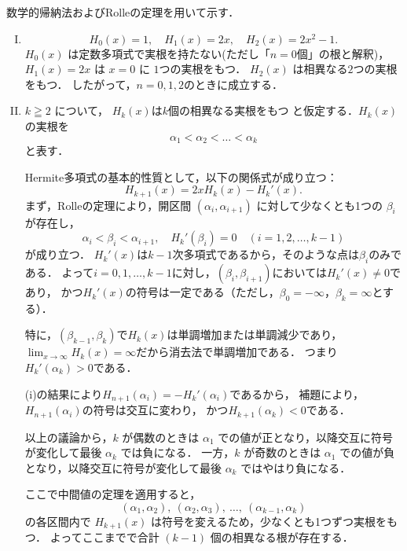 \begin{tproof}
  数学的帰納法およびRolleの定理を用いて示す．
  \noindent
  \begin{enumerate}[(I)]
    \item \mbox{}
          \[
            H_0(x) = 1, \quad H_1(x) = 2x, \quad H_2(x) = 2x^2-1.
          \]
          $H_0(x)$ は定数多項式で実根を持たない(ただし「$n=0$個」の根と解釈)，
          $H_1(x) = 2x$ は $x=0$ に $1$つの実根をもつ．
          $H_2(x)$ は相異なる$2$つの実根をもつ．
          したがって，$n=0,1,2$のときに成立する．
    \item
          $k \geqq 2$ について，
          $H_k(x)$は$k$個の相異なる実根をもつ
          と仮定する．$H_k(x)$ の実根を
          \[
            \alpha_1 < \alpha_2 < \dots < \alpha_k
          \]
          と表す．

          Hermite多項式の基本的性質として，以下の関係式が成り立つ：
          \[
            H_{k+1}(x)  = 2xH_k(x)-H_k'(x).
          \]
          まず，Rolleの定理により，開区間 $(\alpha_i,\alpha_{i+1})$ に対して少なくとも1つの $\beta_i$ が存在し，
          \[
            \alpha_i < \beta_i < \alpha_{i+1},\quad
            H_k'(\beta_i) = 0
            \quad (i=1,2,\dots,k-1)
          \]
          が成り立つ．
          $H_k '(x)$は$k-1$次多項式であるから，そのような点は$\beta_i$のみである．
          よって$i = 0,1,\dots,k-1$に対し，$(\beta_i,\beta_{i+1})$においては$H_k '(x) \ne 0$であり，
          かつ$H_k '(x)$の符号は一定である（ただし，$ \beta_0 =-\infty$，$\beta_k = \infty$とする）．

          特に，$(\beta_{k-1},\beta_k)$で$H_k (x)$は単調増加または単調減少であり，
          $\lim_{x \to \infty} H_k (x) =\infty$だから消去法で単調増加である．
          つまり$H_k ' (\alpha_k) > 0$である．

          (i)の結果により$H_{n+1} (\alpha_i) =-H_k'(\alpha_i)$であるから，
          補題により，$H_{n+1}(\alpha_i)$の符号は交互に変わり，
          かつ$H_{k+1}(\alpha_k) < 0$である．

          以上の議論から，$k$ が偶数のときは $\alpha_1$ での値が正となり，以降交互に符号が変化して最後 $\alpha_k$ では負になる．
          一方，$k$ が奇数のときは $\alpha_1$ での値が負となり，以降交互に符号が変化して最後 $\alpha_k$ ではやはり負になる．

          ここで中間値の定理を適用すると，
          \[
            (\alpha_1,\alpha_2),~(\alpha_2,\alpha_3),~\dots,~(\alpha_{k-1},\alpha_k)
          \]
          の各区間内で $H_{k+1}(x)$ は符号を変えるため，少なくとも1つずつ実根をもつ．
          よってここまでで合計 $(k-1)$ 個の相異なる根が存在する．


\end{enumerate}
\end{tproof}
